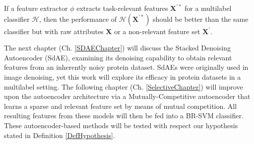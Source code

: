 \begin{definition}
  \label{DefHypothesis}
  If a feature extractor $\phi$ extracts task-relevant features
  $\mathbf{X}^{\prime\ast}$ for a multilabel classifier $\mathcal{H}$, then
  the performance of $\mathcal{H}(\mathbf{X}^{\prime\ast})$ should be
  better than the same classifier but with raw attributes $\mathbf{X}$
  or a non-relevant feature set $\mathbf{X}^{\prime}$.
\end{definition}


\par The next chapter (Ch. \ref{SDAEChapter}) will discuss the Stacked
Denoising Autoencoder (SdAE), examining its denoising capability to obtain
relevant features from an inherently noisy protein dataset. SdAEs were
originally used in image denoising, yet this work will explore its efficacy
in protein datasets in a multilabel setting. The following chapter (Ch.
\ref{SelectiveChapter}) will improve upon the autoencoder architecture via a
Mutually-Competitive autoencoder that learns a sparse and relevant feature
set by means of mutual competition. All resulting features from these models
will then be fed into a BR-SVM classifier. These autoencoder-based methods
will be tested with respect our hypothesis stated in Definition
\ref{DefHypothesis}.
